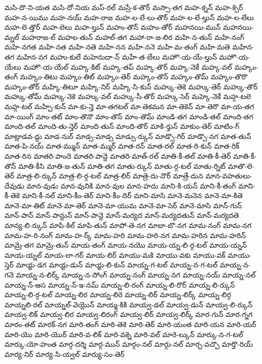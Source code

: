 {మసి-దొ-ని-యత
మసి-దో-నియ
మస్-రల్
మస్రే-క-తొర్
మస్సా-తగ
మహ-క్నన్
మహ-క్సెర్
మహ-న-యిము
మహ-నయ్
మహ-రాజ
మహ-ల-లే-లు-తొర్
మహ-ల-లే-ల్తున్
మహ-ల-లేలు
మహ-లె-త్తొర్
మహ-లెలు
మహ-ల్తున్
మహం-తొన్
మహం-తోర్
మహనయి-మున్
మహనయి-మ్నల్
మహరాజ-ల్
మహల-తున్
మహల్-తగ
మహా-రా-జ-లిర
మహి-న-తున్
మహి-నంగ్
మహి-నగత
మహి-నత
మహి-నతె
మహి-నన
మహి-ననె
మహి-మ-తంగ్
మహి-మతె
మహిన-తగ
మహిన-నగ
మహు-కులే
మహెనుదా-న్
మహే-త-బేలు
మహొ-య-యే-ల్తున్
మహొ-య-యేలు
మహొ-య-యేల్
మహ్క-కిట్
మహ్క-తప్
మహ్క-తొర్
మహ్క-నెకే
మహ్క-వల్
మహ్కం-తంగ్
మహ్కం-తిటు
మహ్కం-తిట్
మహ్కం-తెర్
మహ్కం-తొన్
మహ్కం-తొమ్
మహ్కం-తొరొ
మహ్కం-తోర్
మహ్కి-తిటూ
మహ్కి-నిర్
మహ్కి-సి-కున్
మహ్కు-తెకె
మహ్కు-తెర్
మహ్కు-తొర్
మహ్కు-తోమ్
మహ్కు-నెకె
మహ్కు-వల్
మహ్కు-సీ-తొర్
మహ్కు-సెర్
మహ్కె-నెకే
మహ్గ-టలె
మహ్గ-టల్
మహ్చి-కున్
మా-కు-న్తె
మా-తగటల్
మా-తెకమన
మా-తెకెన్
మా-తెరొ
మా-య-తగ
మా-యింగ్
మాం-తట్
మాం-తొనొ
మాం-తొన్
మాం-తొమ్
మాండి-తగ
మాండి-తల్
మాంది-తగ
మాంది-తల్
మాంది-తు-న్తెర్
మాంది-తున్
మాంది-తొర్
మాకి-ర్తున్
మాకుం-తెర్
మాటిం-గ్
మాట్లాడవ-ద్దు
మాడ-నుర్
మాడ్స-మాడ్స
మాడ్సు-ర్కున్
మాడ్సొ-గిర్
మాడ్సొ-నగ
మాత-తున్
మాత-పి-నయ్
మాత-మ్మున్
మాత-మ్ముర్
మాత-రన్
మాత-రల్
మాత-రి-కున్
మాత-రిక్
మాత-రిన
మాతరి-పాందె
మాతరి-పాన్దె
మాతరి-మాత్-రల్
మాతి-కీ-తల్
మాతి-కీ-తెర్
మాతి-కీ-తొన్
మాతి-కీసి
మాతి-జ-తున్
మాతి-తగ
మాతు-ర్కున్
మాతు-ర్గ-టల్
మాతు-ర్నిట్
మాతొ-లె-తెర్
మాత్ర-లి-ర్కున్
మాత్ర-లి-ర్గ-టల్
మాత్ర-లిర్
మాత్రె-దు-నొర్
మాత్రే-దున
మాన-వహతులు-దేవుడు
మాన-వుడు
మాన-వునికి
మాన-వుల
మాన-హదు
మాని-కి-యన్
మాని-కీ-తంగ్
మాని-కీ-తెకె
మాని-కీ-నల్
మాని-కీం-తెర్
మాని-కీం-దిర్
మాని-మాసి
మానె-మనెన
మానె-మా-కితె
మానె-మా-తిట్
మానె-మా-తెర్
మానె-మా-యుమ
మానె-మా-సెర్
మానె-మాసి
మాన్-గున్
మాన్-పాన్
మాన్-పాన్దున్
మాన్-పాన్దె
మాన్-మర్యద
మాన్-మర్యదతున్
మాన్-మర్యదతె
మాన్య-లి-ర్కున్
మాపి-కిల్
మాపి-తున్
మాపో-తె-నగ
మాబా-బొ-నగ
మామ-నంగ్
మామ-నగ
మామ-హ-రి-నంగ్
మామ-హ-ర్క్
మామ-హరి
మామ-హరి-నగ
మామ-హరిన
మామ-హరిన్
మామ్రె-తగ
మామ్రె-తున్
మాయ-తంగ్
మాయ-నయొ
మాయ-య్న-లి-ర్గ-టల్
మాయ-య్నన్
మాయ-య్నల్
మాయ-లా-గర్
మాయ-లిర్
మాయు-మకి
మాయు-వకు
మాయు-వక్
మాయు-స్తెర్
మాయ్ట-డగ
మాయ్ట-డున్
మాయ్ట-లి-కున్
మాయ్న-గ-టల్
మాయ్న-న-గ-టల్
మాయ్న-న-గనె
మాయ్న-న-లిర్క్
మాయ్న-న-సోంగ్
మాయ్న-నంగ్
మాయ్న-నగ
మాయ్న-నయ్
మాయ్న-నల్
మాయ్న-న్-ఆస
మాయ్న-న్-ఇ-నమ్
మాయ్న-లి-రంగ్
మాయ్న-లి-రొర్
మాయ్న-లి-ర్కున్
మాయ్న-లి-ర్గ-టల్
మాయ్న-లిర
మాయ్న-లిరె
మాయ్న-లిర్
మాయ్న-లిర్క్
మాయ్న-లిర్గ
మాయ్నలి-రల్
మాయ్నల్-వెయ్లొన్
మాయ్మ-కికి
మాయ్వ-డల్
మాయ్వ-డున్
మాయ్వ-లి-ర్కున్
మాయ్వ-లిక్
మాయ్వ-లిర
మాయ్వ-లిరంగ్
మాయ్వ-లిర్
మాయ్వ-లిర్క్
మార-గున్
మార-గ్నగ
మారం-తట్
మారక్-నగ
మారి-తంగ్
మారి-తెకె
మారి-తెర్
మారి-యంత
మారి-యన
మారి-యర్
మారి-యొ
మారి-యొర్
మారి-వ-లిక్
మారి-వక్నె
మారి-వల్
మారె-ల్కున్
మార్కు-న-గ-టల్
మార్కు-యో-హంత
మార్గ-దర్శి
మార్గ-మున్
మార్గం-నల్
మార్గు-నల్
మార్చ-వచ్చొ
మార్తొ-రియ్
మార్య-నిర్
మార్య-సి-య్వల్
మార్యు-సం-తెర్
}
